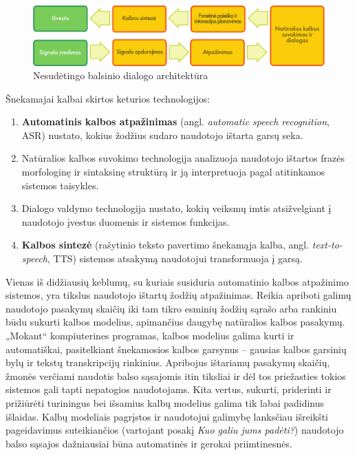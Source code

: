 \begin{multicols}{2}
\begin{figure}[htb]
  \center 
  \includegraphics[width=\textwidth]{../_media/lithuanian/simple_speech-based_dialogue_architecture}
  \caption{Nesudėtingo balsinio dialogo architektūra} %
  \label{fig:dialoguearch_de}
\end{figure}

Šnekamajai kalbai skirtos keturios technologijos:

\begin{enumerate}
\item \textbf{Automatinis kalbos atpažinimas} (angl. \textit{automatic speech recognition}, ASR) nustato, kokius žodžius sudaro naudotojo ištarta garsų seka.
\item Natūralios kalbos suvokimo technologija analizuoja naudotojo ištartos frazės morfologinę ir sintaksinę struktūrą ir ją interpretuoja pagal atitinkamos sistemos taisykles.
\item  Dialogo valdymo technologija nustato, kokių veiksmų imtis atsižvelgiant į naudotojo įvestus duomenis ir sistemos funkcijas.    
\item \textbf{Kalbos sintezė} (rašytinio teksto pavertimo šnekamąja kalba, angl. \textit{text-to-speech}, TTS) sistemos atsakymą naudotojui transformuoja į garsą.
\end{enumerate}

Vienas iš didžiausių keblumų, su kuriais susiduria automatinio kalbos atpažinimo sistemos, yra tikslus naudotojo ištartų žodžių atpažinimas. Reikia apriboti galimų naudotojo pasakymų skaičių iki tam tikro esminių žodžių sąrašo arba rankiniu būdu sukurti kalbos modelius, apimančius daugybę natūralios kalbos pasakymų. „Mokant“   kompiuterines programas, kalbos modelius galima kurti ir automatiškai, pasitelkiant šnekamosios kalbos garsynus – gausias kalbos garsinių bylų ir tekstų transkripcijų rinkinius. Apribojus ištariamų pasakymų skaičių, žmonės verčiami naudotis balso sąsajomis itin tiksliai ir dėl tos priežasties tokios sistemos gali tapti nepatogios naudotojams. Kita vertus, sukurti, priderinti ir prižiūrėti turiningus bei išsamius kalbų modelius galima tik labai padidinus išlaidas. Kalbų modeliais pagrįstos ir naudotojui galimybę lanksčiau išreikšti pageidavimus suteikiančios (vartojant posakį \textit{Kuo galiu jums padėti?}) naudotojo balso sąsajos dažniausiai būna automatinės ir gerokai priimtinesnės. 


\end{multicols}
